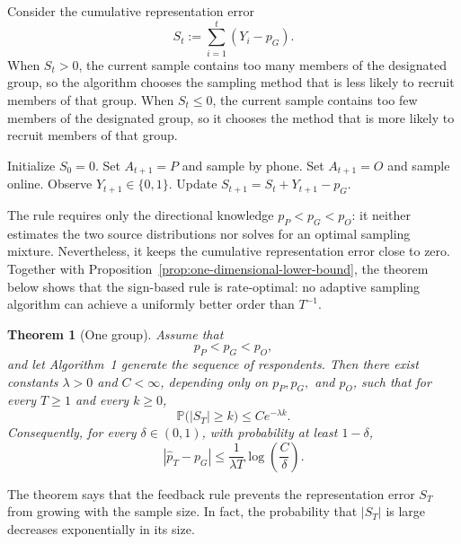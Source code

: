 \documentclass[twoside]{article}
\newtheorem{theorem}{Theorem}
\begin{document}
Consider the cumulative representation error
\begin{equation}
    S_t := \sum_{i=1}^t (Y_i-p_G).
\end{equation}
When \(S_t>0\), the current sample contains too many members of the designated
group, so the algorithm chooses the sampling method that is less likely to
recruit members of that group. When \(S_t\leq 0\), the current sample contains
too few members of the designated group, so it chooses the method that is more
likely to recruit members of that group.

\begin{algorithm}[t]
\caption{Sign-Based Adaptive Sampling}
\label{alg:sign-based}
\begin{algorithmic}[1]
\STATE Initialize \(S_0=0\).
        \STATE Set \(A_{t+1}=P\) and sample by phone.
    \ELSE
        \STATE Set \(A_{t+1}=O\) and sample online.
    \ENDIF
    \STATE Observe \(Y_{t+1}\in\{0,1\}\).
    \STATE Update $S_{t+1}=S_t+Y_{t+1}-p_G$.
\ENDFOR
\end{algorithmic}
\end{algorithm}

The rule requires only the directional knowledge \(p_P<p_G<p_O\): it neither
estimates the two source distributions nor solves for an optimal sampling
mixture. Nevertheless, it keeps the cumulative representation error close to
zero. Together with Proposition~\ref{prop:one-dimensional-lower-bound}, the theorem below shows that
the sign-based rule is rate-optimal: no adaptive sampling algorithm can achieve
a uniformly better order than \(T^{-1}\).
\begin{theorem}[One group]
\label{thm:one-dimensional-guarantee}
Assume that
\[
p_P<p_G<p_O,
\]
and let Algorithm~1 generate the sequence of respondents. Then there exist
constants \(\lambda>0\) and \(C<\infty\), depending only on
\(p_P,p_G,\) and \(p_O\), such that for every \(T\geq1\) and every \(k\geq0\),
\[
\mathbb P\bigl(|S_T|\geq k\bigr)
\leq
Ce^{-\lambda k}.
\]
Consequently, for every \(\delta\in(0,1)\), with probability at least
\(1-\delta\),
\[
\left|\widehat p_T-p_G\right|
\leq
\frac{1}{\lambda T}
\log\left(\frac{C}{\delta}\right).
\]
\end{theorem}

The theorem says that the feedback rule prevents the representation error
\(S_T\) from growing with the sample size. In fact, the probability that
\(|S_T|\) is large decreases exponentially in its size.
\end{document}
